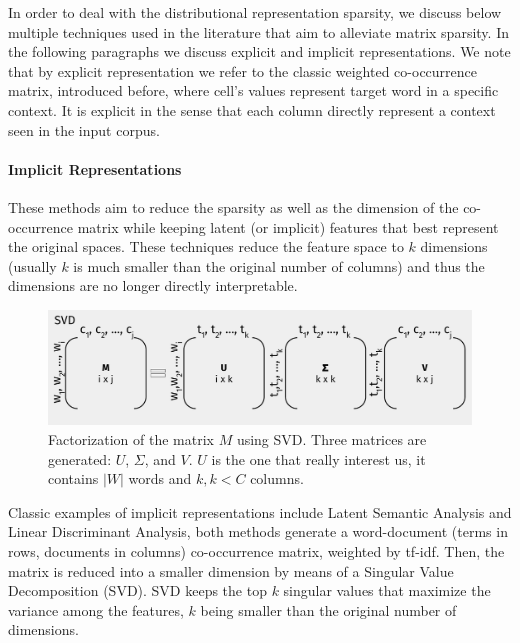 In order to deal with the distributional representation sparsity, we discuss below multiple techniques used in the literature \cite{sahlgren2006word,RatinovR09,piero2017} that aim to alleviate matrix sparsity.  In the following paragraphs we discuss explicit and implicit representations. We note that by explicit representation we refer to the classic weighted co-occurrence matrix, introduced before, where cell's values represent target word in a specific context. It is explicit in the sense that each column directly represent a context seen in the input corpus.
%


\paragraph{Implicit Representations}
These methods aim to reduce the sparsity as well as the dimension of the co-occurrence matrix while keeping latent (or implicit) features that best represent the original spaces. These techniques reduce the feature space to $k$ dimensions (usually $k$ is much smaller than the original number of columns) and thus the dimensions  are no longer directly interpretable.

\begin{figure}
\centering
\includegraphics[width=.8\linewidth]{images/Chapitre2/svd.pdf}
\caption{Factorization of the matrix $M$ using SVD. Three matrices are generated: $U$, $\Sigma$, and $V$. $U$ is the one that really interest us, it contains $|W|$ words and $k, k<C$ columns.}
\label{fig:svd}
\end{figure}

Classic examples of implicit representations include Latent Semantic Analysis and Linear Discriminant Analysis, both methods generate a word-document (terms in rows, documents in columns) co-occurrence matrix, weighted by tf-idf. Then, the matrix is reduced into a smaller dimension by means of a Singular Value Decomposition (SVD). SVD keeps the top $k$ singular values that maximize the variance among the features, $k$ being smaller than the original number of dimensions.

